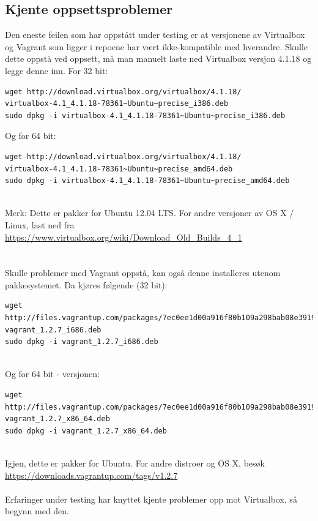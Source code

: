\documentclass{article}
\begin{document}
\subsection{Kjente oppsettsproblemer}
Den eneste feilen som har oppstått under testing er at versjonene av Virtualbox og Vagrant som ligger i repoene har vært ikke-kompatible med hverandre. Skulle dette oppstå ved oppsett, må man manuelt laste ned Virtualbox versjon 4.1.18 og legge denne inn. For 32 bit: 
\begin{lstlisting}
wget http://download.virtualbox.org/virtualbox/4.1.18/
virtualbox-4.1_4.1.18-78361~Ubuntu~precise_i386.deb
sudo dpkg -i virtualbox-4.1_4.1.18-78361~Ubuntu~precise_i386.deb
\end{lstlisting}
Og for 64 bit:
\\ 
\begin{lstlisting}
wget http://download.virtualbox.org/virtualbox/4.1.18/
virtualbox-4.1_4.1.18-78361~Ubuntu~precise_amd64.deb
sudo dpkg -i virtualbox-4.1_4.1.18-78361~Ubuntu~precise_amd64.deb
\end{lstlisting}
\\ 
Merk: Dette er pakker for Ubuntu 12.04 LTS. For andre versjoner av OS X / Linux, last ned fra \\
\url{https://www.virtualbox.org/wiki/Download_Old_Builds_4_1}
\\ \\ \\
Skulle problemer med Vagrant oppstå, kan også denne installeres utenom pakkesystemet. Da kjøres følgende (32 bit): 
\begin{lstlisting}
wget http://files.vagrantup.com/packages/7ec0ee1d00a916f80b109a298bab08e391945243/
vagrant_1.2.7_i686.deb 
sudo dpkg -i vagrant_1.2.7_i686.deb 
\end{lstlisting}
\\
Og for 64 bit - versjonen: 
\begin{lstlisting}
wget http://files.vagrantup.com/packages/7ec0ee1d00a916f80b109a298bab08e391945243/
vagrant_1.2.7_x86_64.deb
sudo dpkg -i vagrant_1.2.7_x86_64.deb
\end{lstlisting}
\\ 
Igjen, dette er pakker for Ubuntu. For andre distroer og OS X, besøk \\
\url{https://downloads.vagrantup.com/tags/v1.2.7} \\ \\
Erfaringer under testing har knyttet kjente problemer opp mot Virtualbox, så begynn med den.
\end{document}
